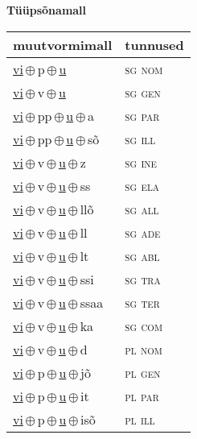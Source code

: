 

\vspace{3.5em}
\noindent \begin{minipage}{\textwidth}
\noindent \textbf{Tüüpsõnamall \,}\\

\begin{sideways}
\begin{tabular}{l l}
muutvormimall & tunnused \\
\hline
\underline{vi}\,$\oplus$\,p\,$\oplus$\,\underline{u} & \textsc{ sg nom } \\
\underline{vi}\,$\oplus$\,v\,$\oplus$\,\underline{u} & \textsc{ sg gen } \\
\underline{vi}\,$\oplus$\,pp\,$\oplus$\,\underline{u}\,$\oplus$\,a & \textsc{ sg par } \\
\underline{vi}\,$\oplus$\,pp\,$\oplus$\,\underline{u}\,$\oplus$\,sõ & \textsc{ sg ill } \\
\underline{vi}\,$\oplus$\,v\,$\oplus$\,\underline{u}\,$\oplus$\,z & \textsc{ sg ine } \\
\underline{vi}\,$\oplus$\,v\,$\oplus$\,\underline{u}\,$\oplus$\,ss & \textsc{ sg ela } \\
\underline{vi}\,$\oplus$\,v\,$\oplus$\,\underline{u}\,$\oplus$\,llõ & \textsc{ sg all } \\
\underline{vi}\,$\oplus$\,v\,$\oplus$\,\underline{u}\,$\oplus$\,ll & \textsc{ sg ade } \\
\underline{vi}\,$\oplus$\,v\,$\oplus$\,\underline{u}\,$\oplus$\,lt & \textsc{ sg abl } \\
\underline{vi}\,$\oplus$\,v\,$\oplus$\,\underline{u}\,$\oplus$\,ssi & \textsc{ sg tra } \\
\underline{vi}\,$\oplus$\,v\,$\oplus$\,\underline{u}\,$\oplus$\,ssaa & \textsc{ sg ter } \\
\underline{vi}\,$\oplus$\,v\,$\oplus$\,\underline{u}\,$\oplus$\,ka & \textsc{ sg com } \\
\underline{vi}\,$\oplus$\,v\,$\oplus$\,\underline{u}\,$\oplus$\,d & \textsc{ pl nom } \\
\underline{vi}\,$\oplus$\,p\,$\oplus$\,\underline{u}\,$\oplus$\,jõ & \textsc{ pl gen } \\
\underline{vi}\,$\oplus$\,p\,$\oplus$\,\underline{u}\,$\oplus$\,it & \textsc{ pl par } \\
\underline{vi}\,$\oplus$\,p\,$\oplus$\,\underline{u}\,$\oplus$\,isõ & \textsc{ pl ill } \\

\end{tabular}
\end{sideways}
\end{minipage}
